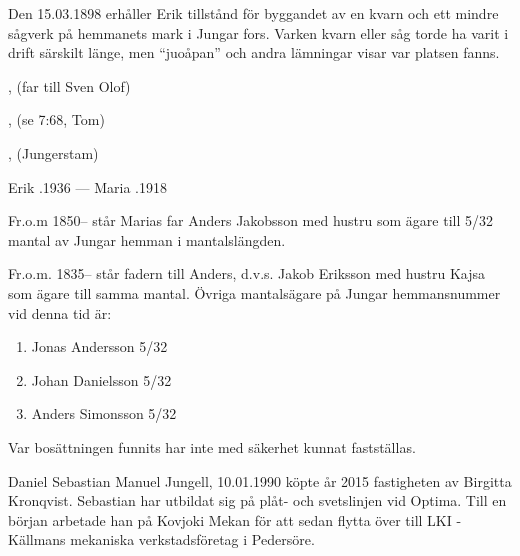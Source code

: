 Den 15.03.1898 erhåller Erik tillstånd för byggandet av en kvarn och ett mindre sågverk på hemmanets mark i Jungar fors. Varken kvarn eller såg torde ha varit i drift särskilt länge, men ``juoåpan'' och andra lämningar visar var platsen fanns.
\begin{jhchildren}
  \item {}
  \item {}
  \item {}, (far till Sven Olof)
  \item {}, (se 7:68, Tom)
  \item {}, (Jungerstam)
  \item {}
\end{jhchildren}

Erik .1936  ---  Maria .1918

Fr.o.m 1850-- står Marias far Anders Jakobsson med hustru som ägare till 5/32 mantal av Jungar hemman i mantalslängden.

Fr.o.m. 1835-- står fadern till Anders, d.v.s. Jakob Eriksson med hustru Kajsa som ägare till samma mantal. Övriga mantalsägare på Jungar hemmansnummer vid denna tid är:
\begin{enumerate}
  \item Jonas Andersson 5/32
  \item Johan Danielsson 5/32
  \item Anders Simonsson 5/32
\end{enumerate}

Var bosättningen funnits har inte med säkerhet kunnat fastställas.






Daniel Sebastian Manuel Jungell, 10.01.1990 köpte år 2015 fastigheten av Birgitta Kronqvist. Sebastian har utbildat sig på plåt- och svetslinjen vid Optima. Till en början arbetade han på Kovjoki Mekan för att sedan flytta över till LKI -Källmans mekaniska verkstadsföretag i Pedersöre.


